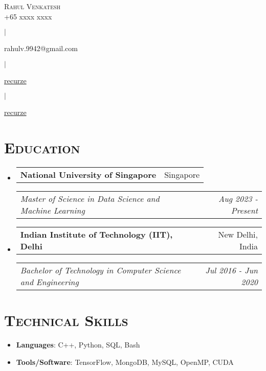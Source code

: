 \documentclass{article}
\makeatletter
\newcommand{\headerrow}[2]
{\begin{tabular*}{\linewidth}{l@{\extracolsep{\fill}}r}
    #1 &
    #2 \\
\end{tabular*}}
\newcommand{\email}[1]{
    \faEnvelope \space #1
}
\newcommand{\phone}[1]{
    \faPhone \space #1
}
\newcommand{\github}[1]{
    \href{https://www.github.com/#1}{\faGithub \space #1}
}
\newcommand{\linkedin}[1]{
    \href{https://www.linkedin.com/in/#1}{\faLinkedin \space #1}
}
\makeatother
\begin{document}
\begin{center}
    {\huge \textsc{Rahul Venkatesh}} \\[2pt]
    \phone{+65 xxxx xxxx}
    $\mid$
    \email{rahulv.9942@gmail.com}
    $\mid$
    \linkedin{recurze}
    $\mid$
    \github{recurze}
\end{center}

\section*{\textsc{\textbf{Education}}}
\begin{itemize}[leftmargin=0em]

\item[]
    \headerrow {\textbf{National University of Singapore}}{Singapore}
    \headerrow {\emph{Master of Science in Data Science and Machine Learning}}{\emph{Aug 2023 - Present}}

\item[]
    \headerrow {\textbf{Indian Institute of Technology (IIT), Delhi}}{New Delhi, India}
    \headerrow {\emph{Bachelor of Technology in Computer Science and Engineering}}{\emph{Jul 2016 - Jun 2020}}

\end{itemize}

%

\section*{\textsc{\textbf{Technical Skills}}}
\begin{itemize}[itemsep=0em, leftmargin=0.7em]
\item[]
    \textbf{Languages}: C++, Python, SQL, Bash
\item[]
    \textbf{Tools/Software}: TensorFlow, MongoDB, MySQL, OpenMP, CUDA
\end{itemize}
\end{document}
